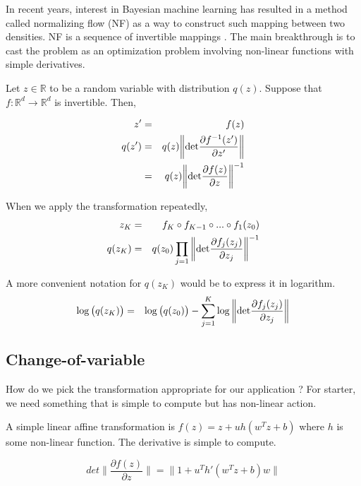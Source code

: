 \documentclass[12pt,a4paper]{article}
\begin{document}
In recent years, interest in Bayesian machine learning has resulted in a method
called normalizing flow (NF) as a way to construct such mapping between two densities. NF is a sequence of invertible mappings \cite{Rezende:2015:VIN:3045118.3045281}. The main breakthrough is to cast the problem as an optimization problem involving non-linear functions with simple derivatives.

Let $z \in \mathbb{R}$ to be a random variable with distribution $q(z)$. Suppose that
$f:\mathbb{R}^d\rightarrow\mathbb{R}^d$ is invertible. Then,

\begin{eqnarray}
z'&=&f(z)\\
q(z')&=&q(z) \bigg\| \textnormal{det} \frac{\partial f^{-1}(z')}{\partial z'} \bigg\|\nonumber\\
     &=&q(z) \bigg\| \textnormal{det} \frac{\partial f(z)}{\partial z} \bigg\|^{-1}
\end{eqnarray}

When we apply the transformation repeatedly,
\begin{eqnarray}
z_K &=& f_K \circ f_{K-1} \circ ... \circ f_1(z_0)\\
q(z_K) &=& q(z_0)   \prod_{j=1} \bigg\| \textnormal{det} \frac{\partial f_j(z_j)}{\partial z_j} \bigg\|^{-1}
\end{eqnarray}

A more convenient notation for $q(z_K)$ would be to express it in logarithm.
\begin{eqnarray}
\log\big(q(z_K)\big) &=& \log\big(q(z_0)\big) - \sum_{j=1}^K   \log \bigg\| \textnormal{det} \frac{\partial f_j(z_j)}{\partial z_j} \bigg\|
\end{eqnarray}

\subsection{Change-of-variable}
How do we pick the transformation appropriate for our application ? For starter,
we need something that is simple to compute but has non-linear action.

A simple linear affine transformation is $f(z)=z+uh(w^Tz+b)$ where $h$ is some
non-linear function. The derivative is simple to compute.

\begin{equation}
det \bigg\| \frac{\partial f(z)}{\partial z} \bigg\| = \big\| 1+u^T h'(w^Tz+b)w \big\|
\end{equation}
\end{document}
